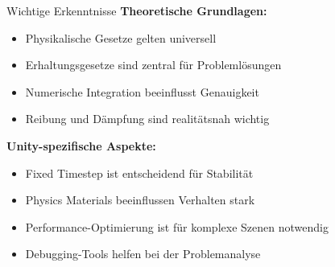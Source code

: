 \begin{concept}{Wichtige Erkenntnisse}
    \textbf{Theoretische Grundlagen:}
    \begin{itemize}
        \item Physikalische Gesetze gelten universell
        \item Erhaltungsgesetze sind zentral für Problemlösungen
        \item Numerische Integration beeinflusst Genauigkeit
        \item Reibung und Dämpfung sind realitätsnah wichtig
    \end{itemize}
    
    \textbf{Unity-spezifische Aspekte:}
    \begin{itemize}
        \item Fixed Timestep ist entscheidend für Stabilität
        \item Physics Materials beeinflussen Verhalten stark
        \item Performance-Optimierung ist für komplexe Szenen notwendig
        \item Debugging-Tools helfen bei der Problemanalyse
    \end{itemize}
\end{concept}